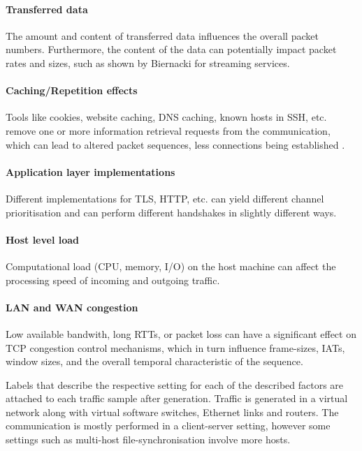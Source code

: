 \documentclass[conference]{IEEEtran}
\begin{document}
\paragraph{Transferred data} 
The amount and content of transferred data influences the overall packet numbers. Furthermore, the content of the data can potentially impact packet rates and sizes, such as shown by Biernacki \cite{biernacki2017analysis} for streaming services.


\paragraph{Caching/Repetition effects}
Tools like cookies, website caching, DNS caching, known hosts in SSH, etc. remove one or more information retrieval requests from the communication, which can lead to altered packet sequences, less connections being established \cite{fricker2012impact}.


\paragraph{Application layer implementations}
Different implementations for TLS, HTTP, etc. can yield different channel prioritisation and can perform different handshakes in slightly different ways.


\paragraph{Host level load}
Computational load (CPU, memory, I/O) on the host machine can affect the processing speed of incoming and outgoing traffic.

\paragraph{LAN and WAN congestion}
Low available bandwith, long RTTs, or packet loss can have a significant effect on TCP congestion control mechanisms, which in turn influence frame-sizes, IATs, window sizes, and the overall temporal characteristic of the sequence.

\vspace{0.2cm}


Labels that describe the respective setting for each of the described factors are attached to each traffic sample after generation. Traffic is generated in a virtual network along with virtual software switches, Ethernet links and routers. The communication is mostly performed in a client-server setting, however some settings such as multi-host file-synchronisation involve more hosts. 
\end{document}
